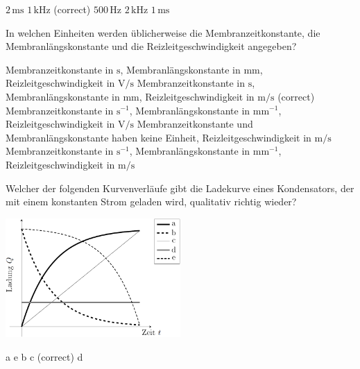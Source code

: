 \documentclass[11pt]{exam}
\begin{document}
\begin{questions}
\begin{choices}
	\choice \(\mathrm{2\,ms}\)
	\choice \(\mathrm{1\,kHz}\) (correct)
	\choice \(\mathrm{500\,Hz}\)
	\choice \(\mathrm{2\,kHz}\)
	\choice \(\mathrm{1\,ms}\)
\end{choices}

\vspace{3mm}\question In welchen Einheiten werden üblicherweise die Membranzeitkonstante, die Membranlängskonstante und die Reizleitgeschwindigkeit angegeben?

\begin{choices}
	\choice Membranzeitkonstante in \(\mathrm{s}\), Membranlängskonstante in \(\mathrm{mm}\), Reizleitgeschwindigkeit in \(\mathrm{V/s}\)
	\choice Membranzeitkonstante in \(\mathrm{s}\), Membranlängskonstante in \(\mathrm{mm}\), Reizleitgeschwindigkeit in \(\mathrm{m/s}\) (correct)
	\choice Membranzeitkonstante in \(\mathrm{s^{-1}}\), Membranlängskonstante in \(\mathrm{mm^{-1}}\), Reizleitgeschwindigkeit in \(\mathrm{V/s}\)
	\choice Membranzeitkonstante und Membranlängskonstante haben keine Einheit, Reizleitgeschwindigkeit in \(\mathrm{m/s}\)
	\choice Membranzeitkonstante in \(\mathrm{s^{-1}}\), Membranlängskonstante in \(\mathrm{mm^{-1}}\), Reizleitgeschwindigkeit in \(\mathrm{m/s}\)
\end{choices}

\vspace{3mm}\question Welcher der folgenden Kurvenverläufe gibt die Ladekurve eines Kondensators, der mit einem konstanten Strom geladen wird, qualitativ richtig wieder? 

\includegraphics[width=0.5\textwidth]{../../../questions/D/images/Kondensator-Q-t.png}

\begin{choices}
	\choice a
	\choice e
	\choice b
	\choice c (correct)
	\choice d
\end{choices}

\vspace{3mm}\end{questions}
\end{document}
